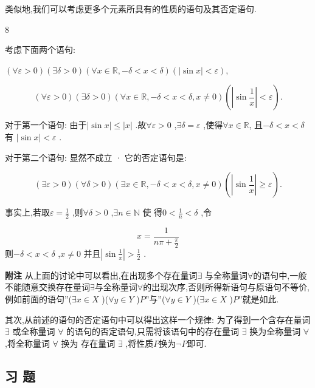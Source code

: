 类似地,我们可以考虑更多个元素所具有的性质的语句及其否定语句.

\begin{sourceexample}{8}

考虑下面两个语句:

\((\forall \varepsilon > 0)(\exists \delta > 0)(\forall x \in \mathbb{R}, -\delta < x < \delta)(|\sin x| < \varepsilon),\)

\[(\forall \varepsilon > 0)(\exists \delta > 0)(\forall x \in \mathbb{R}, -\delta < x < \delta, x \neq 0)(\left|\sin \frac{1}{x}\right| < \varepsilon).\]

对于第一个语句: 由于\(|\sin x| \le |x|\) .故\(\forall \varepsilon > 0\) ,\(\exists \delta = \varepsilon\) ,使得\(\forall x \in \mathbb{R}\), 且\( - \delta < x < \delta \) 有 \(|\sin x| < \varepsilon\) .

对于第二个语句: 显然不成立 · 它的否定语句是:

\[(\exists \varepsilon > 0)(\forall \delta > 0)(\exists x \in \mathbb{R}, -\delta < x < \delta, x \neq 0) \left( \left| \sin \frac{1}{x} \right| \geqslant \varepsilon \right).\]

事实上,若取\(\varepsilon = \frac{1}{2}\) ,则\(\forall \delta > 0\) ,\(\exists n \in \mathbb{N}\) 使 得\(0 < \frac{1}{n} < \delta\) ,令

\[x = \frac{1}{n\pi + \frac{\pi}{2}}\] 则\(-\delta < x < \delta\) ,\(x \neq 0\) 并且\(\left| \sin \frac{1}{x} \right| > \frac{1}{2}\) .

\end{sourceexample}



\textbf{附注} 从上面的讨论中可以看出,在出现多个存在量词$\exists$ 与全称量词$\forall$的语句中,一般不能随意交换存在量词$\exists$与全称量词$\forall$的出现次序,否则所得新语句与原语句不等价,例如前面的语句''(\(\exists x \in X\) )(\( \forall y \in Y\) )$P$''与''(\( \forall y \in Y\) )(\( \exists x \in X\) )$P$''就是如此.

其次,从前述的语句的否定语句中可以得出这样一个规律: 为了得到一个含存在量词 \(\exists\) 或全称量词 \(\forall\) 的语句的否定语句,只需将该语句中的存在量词 \(\exists\) 换为全称量词 \(\forall\) ,将全称量词 \(\forall\) 换为 存在量词 \(\exists\) ,将性质$P$换为$\lnot P$即可.

\subsection{习 题}

